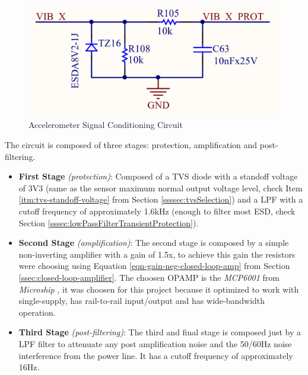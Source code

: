 	\begin{figure}[htbp]
		\centering
			\includegraphics[scale=0.95]{figuras/fig-accelerometer-signal-conditioning-circuit.jpg}
		\caption{Accelerometer Signal Conditioning Circuit \cite{accelerometer-signal-conditioning-circuit}}
		\label{fig:accelerometer-signal-conditioning-circuit}
	\end{figure}


	The circuit is composed of three stages: protection, amplification and post-filtering. 

	\begin{itemize}
		\item \textbf{First Stage} \textit{(protection)}: Composed of a TVS diode with a standoff voltage of 3V3 (same as the sensor maximum normal output voltage level, check Item \ref{itm:tvs-standoff-voltage} from Section \ref{ssssec:tvsSelection}) and a LPF with a cutoff frequency of approximately 1.6kHz (enough to filter most ESD, check Section \ref{sssec:lowPassFilterTransientProtection}). 

		\item \textbf{Second Stage} \textit{(amplification)}: The second stage is composed by a simple non-inverting amplifier with a gain of 1.5x, to achieve this gain the resistors were choosing using Equation \ref{eqn-gain-neg-closed-loop-amp} from Section \ref{ssec:closed-loop-amplifier}. The choosen OPAMP is the \textit{MCP6001} from \textit{Microship} \cite{mcp6001-datasheet}, it was choosen for this project because it optimized to work with single-supply, has rail-to-rail input/output and has wide-bandwidth operation.

		\item \textbf{Third Stage} \textit{(post-filtering)}: The third and final stage is composed just by a LPF filter to attenuate any post amplification noise and the 50/60Hz noise interference from the power line. It has a cutoff frequency of approximately 16Hz.

	\end{itemize}


